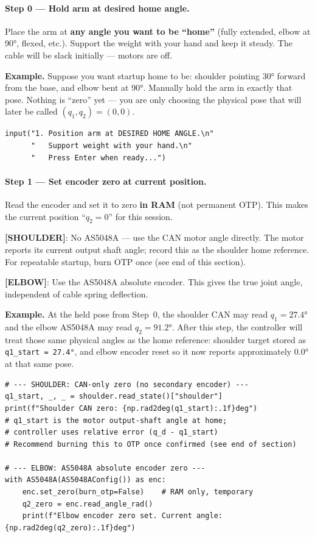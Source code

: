 \documentclass[11pt,a4paper]{article}
\begin{document}
\paragraph{Step 0 --- Hold arm at desired home angle.}
Place the arm at \textbf{any angle you want to be ``home''} (fully extended, elbow
at 90°, flexed, etc.).  Support the weight with your hand and keep it steady.
The cable will be slack initially --- motors are off.

\textbf{Example.}
Suppose you want startup home to be: shoulder pointing 30° forward from the base,
and elbow bent at 90°.  Manually hold the arm in exactly that pose.
Nothing is ``zero'' yet --- you are only choosing the physical pose that will later
be called $(q_1,q_2) = (0,0)$.
\begin{lstlisting}[caption={Hand-position the arm at desired home.}]
input("1. Position arm at DESIRED HOME ANGLE.\n"
      "   Support weight with your hand.\n"
      "   Press Enter when ready...")
\end{lstlisting}

\paragraph{Step 1 --- Set encoder zero at current position.}
Read the encoder and set it to zero \textbf{in RAM} (not permanent OTP).
This makes the current position ``$q_2 = 0$'' for this session.

\textcolor{blue!70!black}{\textbf{[SHOULDER]}}: No AS5048A --- use the CAN motor angle directly.
The motor reports its current output shaft angle; record this as the shoulder home reference.
For repeatable startup, burn OTP once (see end of this section).

\textcolor{green!50!black}{\textbf{[ELBOW]}}: Use the AS5048A absolute encoder.
This gives the true joint angle, independent of cable spring deflection.

\textbf{Example.}
At the held pose from Step~0, the shoulder CAN may read $q_1 = 27.4°$ and the elbow
AS5048A may read $q_2 = 91.2°$.  After this step, the controller will treat those same
physical angles as the home reference: shoulder target stored as \texttt{q1\_start = 27.4°},
and elbow encoder reset so it now reports approximately $0.0°$ at that same pose.

\begin{lstlisting}[caption={Set zeros for both joints.}]
# --- SHOULDER: CAN-only zero (no secondary encoder) ---
q1_start, _, _ = shoulder.read_state()["shoulder"]
print(f"Shoulder CAN zero: {np.rad2deg(q1_start):.1f}deg")
# q1_start is the motor output-shaft angle at home;
# controller uses relative error (q_d - q1_start)
# Recommend burning this to OTP once confirmed (see end of section)

# --- ELBOW: AS5048A absolute encoder zero ---
with AS5048A(AS5048AConfig()) as enc:
    enc.set_zero(burn_otp=False)    # RAM only, temporary
    q2_zero = enc.read_angle_rad()
    print(f"Elbow encoder zero set. Current angle: {np.rad2deg(q2_zero):.1f}deg")
\end{lstlisting}
\end{document}
